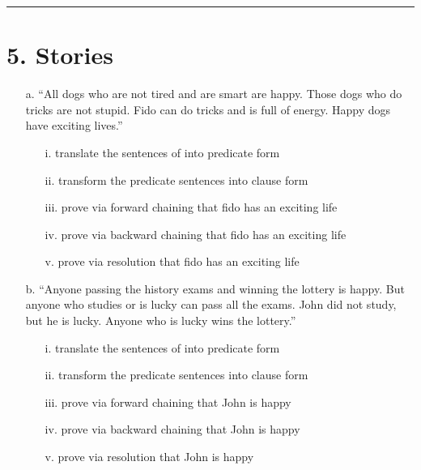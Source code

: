 \documentclass[11pt]{article}
\begin{document}
\begin{flushleft}
\begin{enumerate}
\end{enumerate}

\rule[0.1pt]{40em}{1.0pt}

\section*{5. Stories}
\begin{enumerate}

    \item[a.] “All dogs who are not tired and are smart are happy.  Those dogs
        who do tricks are not stupid.  Fido can do tricks and is full of
        energy.  Happy dogs have exciting lives.”

        \begin{enumerate}
            \item[i.] translate the sentences of into predicate form
            \item[ii.] transform the predicate sentences into clause form
            \item[iii.] prove via forward chaining that fido has an exciting life
            \item[iv.] prove via backward chaining that fido has an exciting life
            \item[v.] prove via resolution that fido has an exciting life
        \end{enumerate}

    \item[b.] “Anyone passing the history exams and winning the lottery is
        happy.  But anyone who studies or is lucky can pass all the exams.
        John did not study, but he is lucky.  Anyone who is lucky wins the
        lottery.”  

        \begin{enumerate}
            \item[i.] translate the sentences of into predicate form
            \item[ii.] transform the predicate sentences into clause form
            \item[iii.] prove via forward chaining that John is happy
            \item[iv.] prove via backward chaining that John is happy
            \item[v.] prove via resolution that John is happy
        \end{enumerate}

\end{enumerate}

\end{flushleft}
\end{document}

